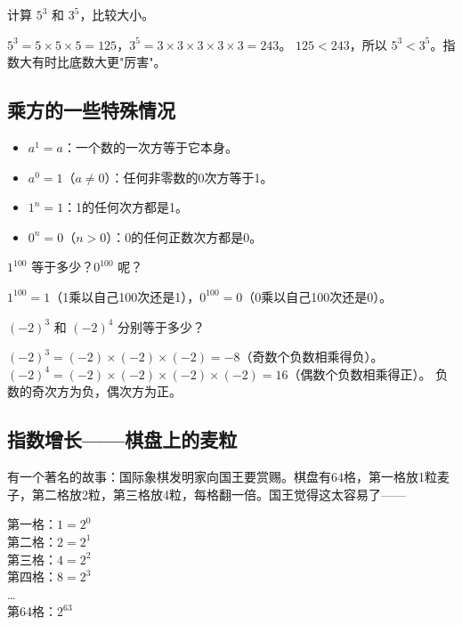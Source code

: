 \begin{example}
计算 $5^3$ 和 $3^5$，比较大小。
\end{example}
\begin{solution}
$5^3 = 5\times5\times5 = 125$，$3^5 = 3\times3\times3\times3\times3 = 243$。
$125 < 243$，所以 $5^3 < 3^5$。指数大有时比底数大更"厉害"。
\end{solution}

\subsection*{乘方的一些特殊情况}

\begin{itemize}
  \item $a^1=a$：一个数的一次方等于它本身。
  \item $a^0=1$（$a\neq0$）：任何非零数的0次方等于1。
  \item $1^n=1$：1的任何次方都是1。
  \item $0^n=0$（$n>0$）：0的任何正数次方都是0。
\end{itemize}

\begin{example}
$1^{100}$ 等于多少？$0^{100}$ 呢？
\end{example}
\begin{solution}
$1^{100}=1$（1乘以自己100次还是1），$0^{100}=0$（0乘以自己100次还是0）。
\end{solution}

\begin{example}
$(-2)^3$ 和 $(-2)^4$ 分别等于多少？
\end{example}
\begin{solution}
$(-2)^3 = (-2)\times(-2)\times(-2) = -8$（奇数个负数相乘得负）。
$(-2)^4 = (-2)\times(-2)\times(-2)\times(-2) = 16$（偶数个负数相乘得正）。
负数的奇次方为负，偶次方为正。
\end{solution}

\subsection*{指数增长——棋盘上的麦粒}

有一个著名的故事：国际象棋发明家向国王要赏赐。棋盘有64格，第一格放1粒麦子，第二格放2粒，第三格放4粒，每格翻一倍。国王觉得这太容易了——

第一格：$1 = 2^0$\\
第二格：$2 = 2^1$\\
第三格：$4 = 2^2$\\
第四格：$8 = 2^3$\\
\ldots\\
第64格：$2^{63}$


